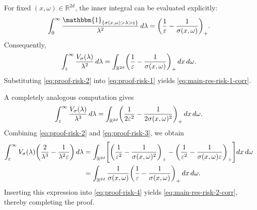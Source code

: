 \documentclass[a4paper,12pt]{article}
\let\originalleft\left
\let\originalright\right
\renewcommand{\left}{\mathopen{}\mathclose\bgroup\originalleft}
\renewcommand{\right}{\aftergroup\egroup\originalright}
\newcommand{\symbolnot}{\sigma}
\begin{document}
For fixed $(x,\omega)\in\mathbb{R}^{2d}$, the inner integral can be evaluated explicitly:
\[
\int_{0}^{\infty}
\frac{\mathbbm{1}_{\{\symbolnot(x,\omega)>\lambda>\varepsilon\}}}{\lambda^2}
\,d\lambda
=
\left(\frac{1}{\varepsilon}-\frac{1}{\symbolnot(x,\omega)}\right)_+ .
\]
Consequently,
\begin{equation}\label{eq:proof-risk-2}
\int_{\varepsilon}^{\infty}\frac{V_{\symbolnot}(\lambda)}{\lambda^2}\,d\lambda
=
\int_{\mathbb{R}^{2d}}
\left(\frac{1}{\varepsilon}-\frac{1}{\symbolnot(x,\omega)}\right)_+
\,dx\,d\omega .
\end{equation}
Substituting \eqref{eq:proof-risk-2} into \eqref{eq:proof-risk-1} yields
\eqref{eq:main-res-risk-1-corr}.

A completely analogous computation gives
\begin{equation}\label{eq:proof-risk-3}
\int_{\varepsilon}^{\infty}\frac{V_{\symbolnot}(\lambda)}{\lambda^3}\,d\lambda
=
\int_{\mathbb{R}^{2d}}
\left(\frac{1}{2\varepsilon^2}-\frac{1}{2\symbolnot(x,\omega)^2}\right)_+
\,dx\,d\omega .
\end{equation}
Combining \eqref{eq:proof-risk-2} and \eqref{eq:proof-risk-3}, we obtain
\begin{align*}
\int_{\varepsilon}^{\infty}
V_{\symbolnot}(\lambda)
\left(\frac{2}{\lambda^3}-\frac{1}{\lambda^2\varepsilon}\right)
\,d\lambda
&=
\int_{\mathbb{R}^{2d}}
\left[
\left(\frac{1}{\varepsilon^2}-\frac{1}{\symbolnot(x,\omega)^2}\right)_+
-
\left(\frac{1}{\varepsilon^2}-\frac{1}{\symbolnot(x,\omega)\varepsilon}\right)_+
\right]
dx\,d\omega \\
&=
\int_{\mathbb{R}^{2d}}
\frac{1}{\symbolnot(x,\omega)}
\left(\frac{1}{\varepsilon}-\frac{1}{\symbolnot(x,\omega)}\right)_+
\,dx\,d\omega .
\end{align*}
Inserting this expression into \eqref{eq:proof-risk-4} yields
\eqref{eq:main-res-risk-2-corr}, thereby completing the proof.


\end{document}
